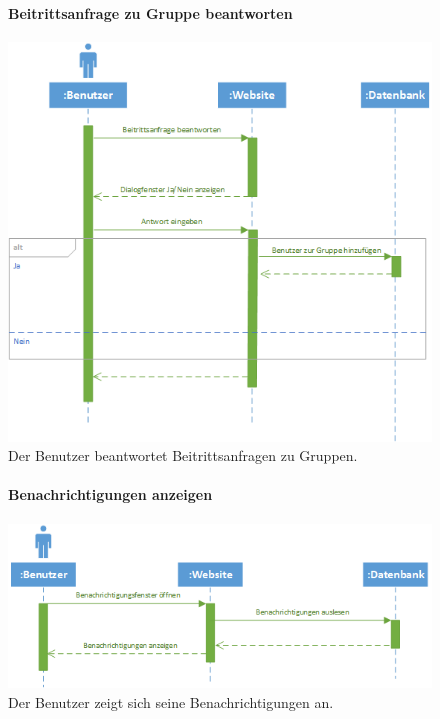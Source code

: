 \documentclass[12pt,a4paper]{article}
\begin{document}
\begin{figure}[H]
	\centering
	\paragraph{Beitrittsanfrage zu Gruppe beantworten}
	\includegraphics[width=\textwidth]{Bilder/Sequenzdiagramme/BeitrittsanfrageZuGruppe.png}
	\caption{Der Benutzer beantwortet Beitrittsanfragen zu Gruppen.}
	\label{SzBeitrittsanfrageZuGruppe}
\end{figure}
\begin{figure}[H]
	\centering
	\paragraph{Benachrichtigungen anzeigen}
	\includegraphics[width=\textwidth]{Bilder/Sequenzdiagramme/BenachrichtigungenAnzeigen.png}
	\caption{Der Benutzer zeigt sich seine Benachrichtigungen an.}
	\label{SzBenachrichtigungen}
\end{figure}
\end{document}
